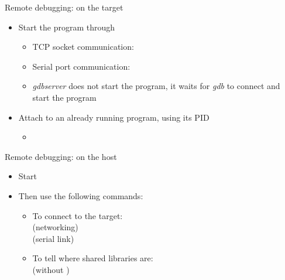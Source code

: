 \begin{frame}{Remote debugging: on the target}
  \begin{itemize}
  \item Start the program through 
    \begin{itemize}
    \item TCP socket communication: 
    \item Serial port communication: 
    \item {\em gdbserver} does not start the program, it waits for
      {\em gdb} to connect and start the program
    \end{itemize}
  \item Attach  to an already running program, using
    its PID
    \begin{itemize}
    \item {}
    \end{itemize}
  \end{itemize}
\end{frame}

\begin{frame}{Remote debugging: on the host}
  \begin{itemize}
  \item Start 
  \item Then use the following  commands:
    \begin{itemize}
    \item To connect to the target:\\
       (networking)\\
       (serial link)
    \item To tell  where shared libraries are:\\
       (without )
    \end{itemize}
  \end{itemize}
\end{frame}

